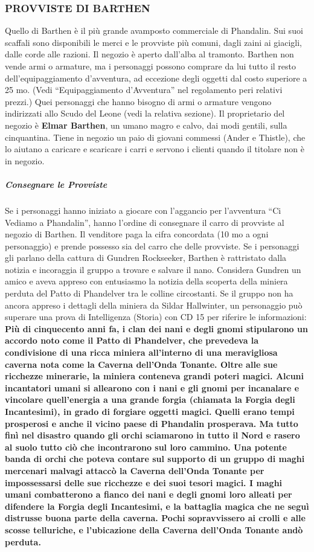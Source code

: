 \documentclass{article}
\begin{document}
\subsubsection{PROVVISTE DI BARTHEN}
\hypertarget{provviste}{}
Quello di Barthen è il più grande avamposto commerciale
di Phandalin. Sui suoi scaffali sono disponibili le merci e le
provviste più comuni, dagli zaini ai giacigli, dalle corde alle
razioni. Il negozio è aperto dall’alba al tramonto. Barthen non
vende armi o armature, ma i personaggi possono comprare
da lui tutto il resto dell’equipaggiamento d’avventura, ad
eccezione degli oggetti dal costo superiore a 25 mo. (Vedi
“Equipaggiamento d’Avventura” nel regolamento peri
relativi prezzi.) Quei personaggi che hanno bisogno di armi
o armature vengono indirizzati allo Scudo del Leone (vedi la
relativa sezione).
Il proprietario del negozio è \textbf{Elmar Barthen}, un umano
magro e calvo, dai modi gentili, sulla cinquantina. Tiene in
negozio un paio di giovani commessi (Ander e Thistle), che
lo aiutano a caricare e scaricare i carri e servono i clienti
quando il titolare non è in negozio.
\subparagraph{Consegnare le Provviste}
Se i personaggi hanno iniziato
a giocare con l'aggancio per l'avventura “Ci Vediamo a
Phandalin”, hanno l’ordine di consegnare il carro di provviste
al negozio di Barthen. Il venditore paga la cifra concordata
(10 mo a ogni personaggio) e prende possesso sia del carro
che delle provviste. Se i personaggi gli parlano della cattura
di Gundren Rockseeker, Barthen è rattristato dalla notizia
e incoraggia il gruppo a trovare e salvare il nano. Considera
Gundren un amico e aveva appreso con entusiasmo la notizia
della scoperta della miniera perduta del Patto di Phandelver
tra le colline circostanti. Se il gruppo non ha ancora appreso
i dettagli della miniera da Sildar Hallwinter, un personaggio
può superare una prova di Intelligenza (Storia) con CD 15
per riferire le informazioni: \textbf{Più di cinquecento anni fa, i clan dei nani e degli gnomi
stipularono un accordo noto come il Patto di Phandelver, che
prevedeva la condivisione di una ricca miniera all’interno di
una meravigliosa caverna nota come la Caverna dell’Onda
Tonante. Oltre alle sue ricchezze minerarie, la miniera
conteneva grandi poteri magici. Alcuni incantatori umani si
allearono con i nani e gli gnomi per incanalare e vincolare
quell’energia a una grande forgia (chiamata la Forgia degli
Incantesimi), in grado di forgiare oggetti magici. Quelli
erano tempi prosperosi e anche il vicino paese di Phandalin
prosperava. Ma tutto finì nel disastro quando gli orchi
sciamarono in tutto il Nord e rasero al suolo tutto ciò che
incontrarono sul loro cammino.
Una potente banda di orchi che poteva contare sul supporto
di un gruppo di maghi mercenari malvagi attaccò la Caverna
dell’Onda Tonante per impossessarsi delle sue ricchezze e dei
suoi tesori magici. I maghi umani combatterono a fianco dei
nani e degli gnomi loro alleati per difendere la Forgia degli
Incantesimi, e la battaglia magica che ne seguì distrusse
buona parte della caverna. Pochi sopravvissero ai crolli e
alle scosse telluriche, e l'ubicazione della Caverna dell’Onda
Tonante andò perduta.}
\end{document}
